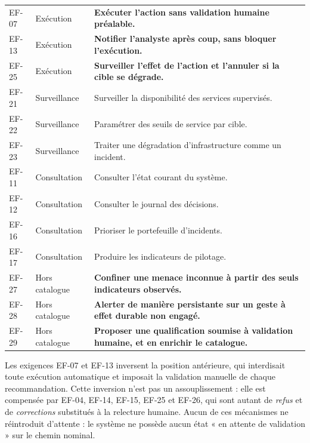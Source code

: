 \begin{table}[H]
\begin{tabular}{@{}llp{9.2cm}@{}}
\addlinespace
EF-07 & Ex\'ecution & \textbf{Ex\'ecuter l'action sans validation humaine pr\'ealable.} \\
EF-13 & Ex\'ecution & \textbf{Notifier l'analyste apr\`es coup, sans bloquer l'ex\'ecution.} \\
EF-25 & Ex\'ecution & \textbf{Surveiller l'effet de l'action et l'annuler si la cible se d\'egrade.} \\
\addlinespace
EF-21 & Surveillance & Surveiller la disponibilit\'e des services supervis\'es. \\
EF-22 & Surveillance & Param\'etrer des seuils de service par cible. \\
EF-23 & Surveillance & Traiter une d\'egradation d'infrastructure comme un incident. \\
\addlinespace
EF-11 & Consultation & Consulter l'\'etat courant du syst\`eme. \\
EF-12 & Consultation & Consulter le journal des d\'ecisions. \\
EF-16 & Consultation & Prioriser le portefeuille d'incidents. \\
EF-17 & Consultation & Produire les indicateurs de pilotage. \\
\addlinespace
EF-27 & Hors catalogue & \textbf{Confiner une menace inconnue \`a partir des seuls indicateurs observ\'es.} \\
EF-28 & Hors catalogue & \textbf{Alerter de mani\`ere persistante sur un geste \`a effet durable non engag\'e.} \\
EF-29 & Hors catalogue & \textbf{Proposer une qualification soumise \`a validation humaine, et en enrichir le catalogue.} \\
\bottomrule
\end{tabular}
\end{table}

\begin{tcolorbox}[colback=umlalerte!5, colframe=umlalerte, boxrule=0.5pt, sharp corners,
                  fontupper=\small, title=\textbf{Inversion assum\'ee par rapport \`a la version pr\'ec\'edente du cahier des charges}]
Les exigences EF-07 et EF-13 inversent la position ant\'erieure, qui interdisait
toute ex\'ecution automatique et imposait la validation manuelle de chaque
recommandation. Cette inversion n'est pas un assouplissement : elle est
compens\'ee par EF-04, EF-14, EF-15, EF-25 et EF-26, qui sont autant de
\emph{refus} et de \emph{corrections} substitu\'es \`a la relecture humaine. Aucun de
ces m\'ecanismes ne r\'eintroduit d'attente : le syst\`eme ne poss\`ede aucun \'etat
« en attente de validation » sur le chemin nominal.
\end{tcolorbox}

